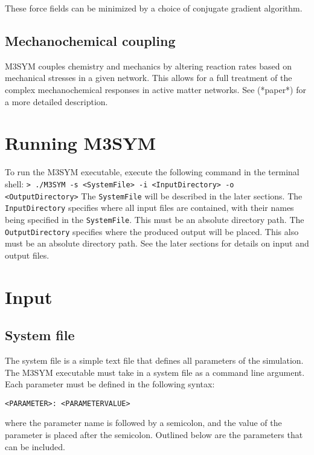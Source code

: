 \documentclass[11pt, oneside]{article}   	%
\begin{document}
\noindent These force fields can be minimized by a choice of conjugate gradient algorithm.

\subsection{Mechanochemical coupling} 

M3SYM couples chemistry and mechanics by altering reaction rates based on mechanical stresses in a given 
network. This allows for a full treatment of the complex mechanochemical responses in active matter networks.
See (*paper*) for a more detailed description.

\section{Running M3SYM}

To run the M3SYM executable, execute the following command in the terminal shell: \newline \newline\indent \texttt{> ./M3SYM -s <SystemFile> -i <InputDirectory> -o <OutputDirectory>} \newline \newline The \texttt{SystemFile} will be described in the later sections. \newline\newline  The \texttt{InputDirectory} specifies where all input files are contained, with their names being specified in the \texttt{SystemFile}. This must be an absolute directory path. The \texttt{OutputDirectory} specifies where the produced output will be placed. This also must be an absolute directory path. See the later sections for details on input and output files.
\section {Input}

\subsection{System file}

The system file is a simple text file that defines all parameters of the simulation. The M3SYM executable must take
 in a system file as a command line argument. \newline\newline Each parameter must be defined in the following syntax: \newline \newline \centerline{\texttt{<PARAMETER>:  <PARAMETERVALUE>}} \newline\newline where the parameter name is followed by a semicolon, and the value of the parameter is placed after the semicolon. Outlined below are the parameters that can be included. \\
 
\end{document}
